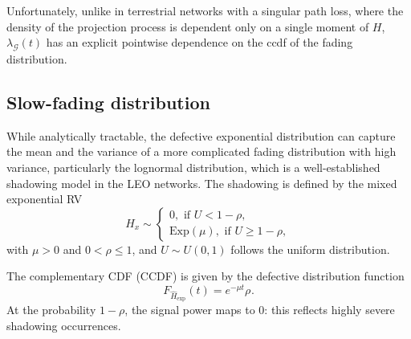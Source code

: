 \documentclass[conference]{IEEEtran}
\theoremstyle{definition}
\theoremstyle{plain}
\begin{document}
          Unfortunately, unlike in terrestrial networks with a singular path loss, where the density of the projection process is dependent only on a single moment of $H$, $\lambda_{\mathcal{G}}(t)$ has an explicit pointwise dependence on the ccdf of the fading distribution. 


                      \subsection{Slow-fading distribution}
 While analytically tractable, the defective exponential distribution can capture the mean and the variance of a more complicated fading distribution with high variance, particularly the lognormal distribution, which is a well-established shadowing model in the LEO networks. The shadowing is defined by the mixed exponential RV
             \begin{equation}
               \hat{H}_x \sim
            \begin{cases}
               0, \text{ if } U < 1-\rho,\\
                \text{Exp}(\mu), \text{ if } U \geq1- \rho,              \label{eq:tier2exponential}
            \end{cases}
            \end{equation}
             with $\mu>0$ and $0<\rho\leq1$, and $U \sim U(0,1)$ follows the uniform distribution.


            The complementary CDF (CCDF) is given by the defective distribution function
            \begin{equation}
              \label{eq:defexp}
              F_{\hat{H}_{\text{exp}}}(t)=e^{-\mu t}\rho_{}.
            \end{equation}
            At the probability $1-\rho$, the signal power maps to $0$: this reflects highly severe shadowing occurrences. 
\end{document}
